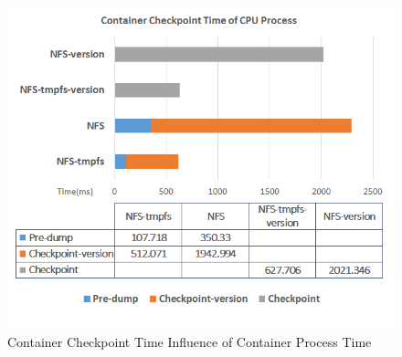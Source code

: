 \begin{figure}[h]
\begin{center}
\includegraphics[width=14cm]{figure/cpu_checkpoint_time.png}
\end{center}
\caption{Container Checkpoint Time Influence of Container Process Time}
\label{fig:Checkpoint Time Influence CPU}
\end{figure}